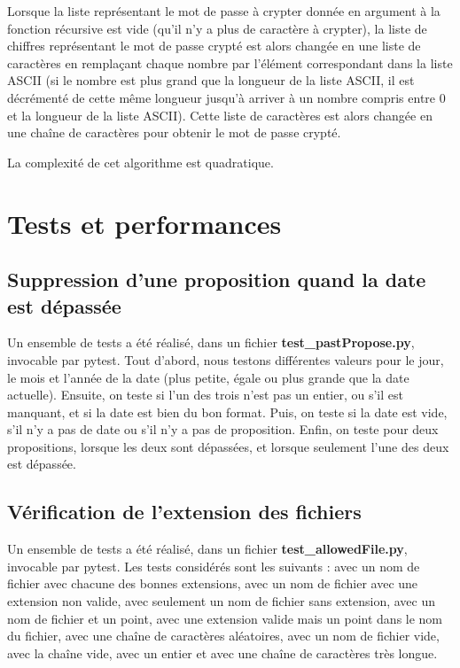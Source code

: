 \documentclass{article}
\begin{document}
Lorsque la liste représentant le mot de passe à crypter donnée en argument à la fonction récursive est vide (qu'il n'y a plus de caractère à crypter), la liste de chiffres représentant le mot de passe crypté est alors changée en une liste de caractères en remplaçant chaque nombre par l'élément correspondant dans la liste ASCII (si le nombre est plus grand que la longueur de la liste ASCII, il est décrémenté de cette même longueur jusqu'à arriver à un nombre compris entre 0 et la longueur de la liste ASCII). Cette liste de caractères est alors changée en une chaîne de caractères pour obtenir le mot de passe crypté.

La complexité de cet algorithme est quadratique.

\newpage
\section{Tests et performances}
\subsection{Suppression d'une proposition quand la date est dépassée}
Un ensemble de tests a été réalisé, dans un fichier \textbf{test\_pastPropose.py}, invocable par pytest. Tout d'abord, nous testons différentes valeurs pour le jour, le mois et l'année de la date (plus petite, égale ou plus grande que la date actuelle). Ensuite, on teste si l'un des trois n'est pas un entier, ou s'il est manquant, et si la date est bien du bon format. Puis, on teste si la date est vide, s'il n'y a pas de date ou s'il n'y a pas de proposition. Enfin, on teste pour deux propositions, lorsque les deux sont dépassées, et lorsque seulement l'une des deux est dépassée.

\subsection{Vérification de l'extension des fichiers}
Un ensemble de tests a été réalisé, dans un fichier \textbf{test\_allowedFile.py}, invocable par pytest. Les tests considérés sont les suivants : avec un nom de fichier avec chacune des bonnes extensions, avec un nom de fichier avec une extension non valide, avec seulement un nom de fichier sans extension, avec un nom de fichier et un point, avec une extension valide mais un point dans le nom du fichier, avec une chaîne de caractères aléatoires, avec un nom de fichier vide, avec la chaîne vide, avec un entier et avec une chaîne de caractères très longue.
\end{document}
